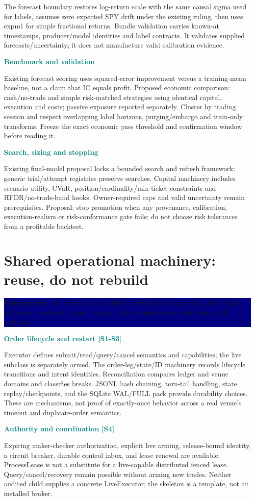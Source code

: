 \documentclass[10pt,letterpaper]{article}
\newcommand{\bl}[1]{\noindent\colorbox{navy}{\parbox{\dimexpr\linewidth-2\fboxsep}{\color{white}\textbf{Bottom line.} #1}}\par\medskip}
\newcommand{\topic}[2]{\clearpage\section{#1}\bl{#2}}
\newcommand{\sub}[1]{\par\textbf{\textcolor{teal}{#1}}\par}
\begin{document}
The forecast boundary restores log-return scale with the same causal sigma used for labels, assumes zero expected SPY drift under the existing ruling, then uses expm1 for simple fractional returns. Bundle validation carries known-at timestamps, producer/model identities and label contracts. It validates supplied forecasts/uncertainty; it does not manufacture valid calibration evidence.
\sub{Benchmark and validation}
Existing forecast scoring uses squared-error improvement versus a training-mean baseline, not a claim that IC equals profit. Proposed economic comparison: cash/no-trade and simple risk-matched strategies using identical capital, execution and costs; passive exposure reported separately. Cluster by trading session and respect overlapping label horizons, purging/embargo and train-only transforms. Freeze the exact economic pass threshold and confirmation window before reading it.
\sub{Search, sizing and stopping}
Existing final-model proposal locks a bounded search and refresh framework; generic trial/attempt registries preserve searches. Capital machinery includes scenario utility, CVaR, position/cardinality/min-ticket constraints and HFDR/no-trade-band hooks. Owner-required caps and valid uncertainty remain prerequisites. Proposal: stop promotion when any provenance, calibration, execution-realism or risk-conformance gate fails; do not choose risk tolerances from a profitable backtest.
\topic{Shared operational machinery: reuse, do not rebuild}{The toolkit has a credible control-plane foundation. Each child still needs a complete venue binding, policy configuration, and failure-drill evidence.}
\sub{Order lifecycle and restart [S1-S3]}
Executor defines submit/read/query/cancel semantics and capabilities; the live subclass is separately armed. The order-leg/state/ID machinery records lifecycle transitions and intent identities. Reconciliation compares ledger and venue domains and classifies breaks. JSONL hash chaining, torn-tail handling, state replay/checkpoints, and the SQLite WAL/FULL pack provide durability choices. These are mechanisms, not proof of exactly-once behavior across a real venue's timeout and duplicate-order semantics.
\sub{Authority and coordination [S4]}
Expiring maker-checker authorization, explicit live arming, release-bound identity, a circuit breaker, durable control inbox, and lease renewal are available. ProcessLease is not a substitute for a live-capable distributed fenced lease. Query/cancel/recovery remain possible without arming new trades. Neither audited child supplies a concrete LiveExecutor; the skeleton is a template, not an installed broker.
\end{document}
